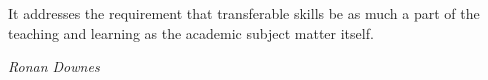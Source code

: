 It addresses the requirement that transferable skills be as much a part of the teaching and learning as the academic subject matter itself.




\begin{flushright}
	\textit{Ronan Downes}
\end{flushright}





